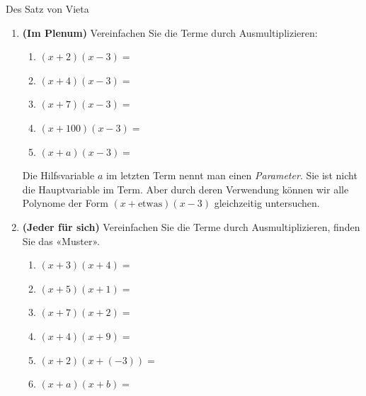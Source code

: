 \begin{LA}
    {Des Satz von Vieta}{}


    \begin{enumerate}
        \item \textbf{(Im Plenum)} Vereinfachen Sie die Terme durch Ausmultiplizieren:
              \begin{enumerate}
                  \item \((x+2)(x-3)=\)    \vspace*{0.5cm}
                  \item \((x+4)(x-3)=\)    \vspace*{0.5cm}
                  \item \((x+7)(x-3)=\)    \vspace*{0.5cm}
                  \item \((x+100)(x-3)=\)    \vspace*{0.5cm}
                  \item \((x+a)(x-3)=\)    \vspace*{0.5cm}
              \end{enumerate}

              Die Hilfsvariable \(a\) im letzten Term nennt man einen
              \emph{Parameter}. Sie ist nicht die Hauptvariable im Term.
              Aber durch deren Verwendung können wir alle Polynome der Form
              \((x+\text{etwas})(x-3)\) gleichzeitig untersuchen.

        \item \textbf{(Jeder für sich)} Vereinfachen Sie die Terme durch
              Ausmultiplizieren, finden Sie das «Muster».
              \begin{enumerate}
                  \item \((x+3)(x+4)=\)     \vspace*{0.5cm}
                  \item \((x+5)(x+1)=\)    \vspace*{0.5cm}
                  \item \((x+7)(x+2)=\)    \vspace*{0.5cm}
                  \item \((x+4)(x+9)=\)    \vspace*{0.5cm}
                  \item \((x+2)(x+(-3))=\)    \vspace*{0.5cm}
                  \item \((x+a)(x+b)=\)    \vspace*{0.5cm}
              \end{enumerate}


\end{enumerate}
\end{LA}
